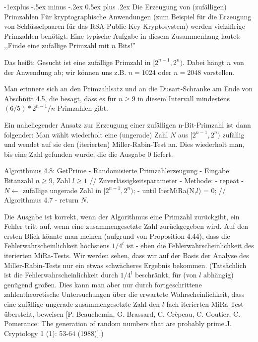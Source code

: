 \documentclass[a4paper]{article}
\makeatletter
\renewcommand{\subsection}{\@startsection{subsection}{2}{0mm}%
 {-1explus -.5ex minus -.2ex}%
 {0.5ex plus .2ex}%
 {\normalfont\normalsize\bfseries}}
\makeatother
\begin{document}
\begin{multicols}{3}
        \subsection{Die Erzeugung von (zufälligen) Primzahlen}
        Für kryptographische Anwendungen (zum Beispiel für die Erzeugung von Schlüsselpaaren für das RSA-Public-Key-Kryptosystem) werden vielziffrige Primzahlen benötigt. Eine typische Aufgabe in diesem Zusammenhang lautet: ,,Finde eine zufällige Primzahl mit $n$ Bits!''

        Das heißt: Gesucht ist eine zufällige Primzahl in $[2^{n-1}, 2^n)$. Dabei hängt $n$ von der Anwendung ab; wir können uns z.B. $n=1024$ oder $n=2048$ vorstellen.

        Man erinnere sich an den Primzahlsatz und an die Dusart-Schranke am Ende von Abschnitt 4.5, die besagt, dass es für $n\geq 9$ in diesem Intervall mindestens $(6/5)*
    2^{n-1}/n$ Primzahlen gibt.

        Ein naheliegender Ansatz zur Erzeugung einer zufälligen n-Bit-Primzahl ist dann folgender: Man wählt wiederholt eine (ungerade) Zahl $N$ aus $[2^{n-1}, 2^n)$ zufällig und wendet auf sie den (iterierten) Miller-Rabin-Test an. Dies wiederholt man, bis eine Zahl gefunden wurde, die die Ausgabe $0$ liefert.

        Algorithmus 4.8: GetPrime - Randomisierte Primzahlerzeugung
        - Eingabe: Bitanzahl $n\geq 9$, Zahl $l\geq 1$ // Zuverlässigkeitsparameter
        - Methode:
        - repeat
        - $N\leftarrow$ zufällige ungerade Zahl in $[2^{n-1}, 2^n)$;
        - until IterMiRa(N,$l$) = 0; // Algorithmus 4.7
        - return $N$.

        Die Ausgabe ist korrekt, wenn der Algorithmus eine Primzahl zurückgibt, ein Fehler tritt auf, wenn eine zusammengesetzte Zahl zurückgegeben wird. Auf den ersten Blick könnte man meinen (aufgrund von Proposition 4.44), dass die Fehlerwahrscheinlichkeit höchstens $1/4^l$ ist - eben die Fehlerwahrscheinlichkeit des iterierten MiRa-Tests. Wir werden sehen, dass wir auf der Basis der Analyse des Miller-Rabin-Tests nur ein etwas schwächeres Ergebnis bekommen. (Tatsächlich ist die Fehlerwahrscheinlichkeit durch $1/4^l$ beschränkt, für (von $l$ abhängig) genügend großen. Dies kann man aber nur durch fortgeschrittene zahlentheoretische Untersuchungen über die erwartete Wahrscheinlichkeit, dass eine zufällige ungerade zusammengesetzte Zahl den $l$-fach iterierten MiRa-Test übersteht, beweisen [P. Beauchemin, G. Brassard, C. Crèpeau, C. Goutier, C. Pomerance: The generation of random numbers that are probably prime.J. Cryptology 1 (1): 53-64 (1988)].)


\end{multicols}
\end{document}
